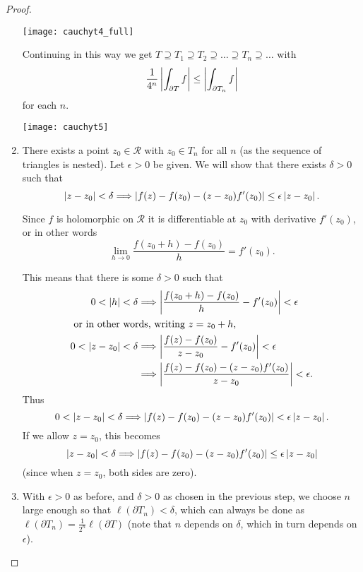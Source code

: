 \begin{proof}
\begin{enumerate}
\begin{center}
\texttt{[image: cauchyt4\_full]}
\end{center}


Continuing in this way we get $T\supseteq T_1 \supseteq T_2 \supseteq \ldots \supseteq T_n \supseteq \ldots$ with 
\[
\frac{1}{4^n} \left|  \int_{\partial T} f \right| \leq \left|  \int_{\partial T_n} f  \right|
\]
for each $n$.
\begin{center}
\texttt{[image: cauchyt5]}
\end{center}

\item There exists a point $z_0 \in \mathcal{R}$ with $z_0 \in T_n$ for all $n$ (as the sequence of triangles is nested).  Let $\epsilon>0$ be given.  We will show that there exists $\delta>0$ such that 
\[
\left| z-z_0 \right|<\delta \Longrightarrow \left| f(z)-f(z_0)-(z-z_0)f'(z_0) \right| \leq \epsilon \left| z-z_0 \right|.
\]

  Since $f$ is holomorphic on $\mathcal{R}$ it is differentiable at $z_0$ with derivative $f'(z_0)$, or in other words
  \[
  \lim_{h \to 0} \frac{f(z_0+h)-f(z_0)}{h} = f'(z_0).
  \]  

  This means that there is some $\delta>0$ such that
  \begin{align*}
  0 < \left| h \right| < \delta &\Longrightarrow \left|  \frac{f(z_0+h)-f(z_0)}{h} - f'(z_0)  \right| < \epsilon \\
  \shortintertext{ or in other words, writing $z=z_0+h$,}
  0 < \left| z-z_0 \right| < \delta &\Longrightarrow \left|  \frac{f(z)-f(z_0)}{z-z_0} - f'(z_0)  \right| < \epsilon \\
  & \Longrightarrow \left|  \frac{f(z)-f(z_0)-(z-z_0)f'(z_0)}{z-z_0}  \right| < \epsilon.
  \end{align*}
Thus
\[
0 < \left| z-z_0 \right| < \delta \Longrightarrow \left| f(z)-f(z_0)-(z-z_0)f'(z_0) \right| < \epsilon \left| z-z_0 \right|.
\]
If we allow $z=z_0$, this becomes
\[
\left| z-z_0 \right| < \delta \Longrightarrow \left| f(z)-f(z_0)-(z-z_0)f'(z_0) \right| \leq \epsilon \left| z-z_0 \right|
\]
(since when $z=z_0$, both sides are zero).

\item With $\epsilon>0$ as before, and $\delta>0$ as chosen in the previous step, we choose $n$ large enough so that $\ell ( \partial T_n ) < \delta$, which can always be done as $\ell ( \partial T_n ) = \frac{1}{2^n} \ell ( \partial T)$ (note that $n$ depends on $\delta$, which in turn depends on $\epsilon$).


\end{enumerate}
\end{proof}
